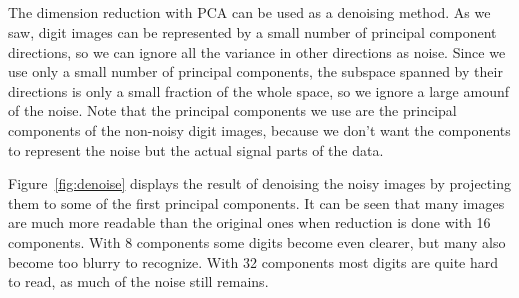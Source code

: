 \documentclass{article}
\begin{document}
\subsection{}

The dimension reduction with PCA can be used as a denoising method.
As we saw, digit images can be represented by a small number of principal component directions, so we can ignore all the variance in other directions as noise.
Since we use only a small number of principal components, the subspace spanned by their directions is only a small fraction of the whole space, so we ignore a large amounf of the noise.
Note that the principal components we use are the principal components of the non-noisy digit images, because we don't want the components to represent the noise but the actual signal parts of the data.

Figure~\ref{fig:denoise} displays the result of denoising the noisy images by projecting them to some of the first principal components. It can be seen that many images are much more readable than the original ones when reduction is done with 16 components. With 8 components some digits become even clearer, but many also become too blurry to recognize. With 32 components most digits are quite hard to read, as much of the noise still remains.
\end{document}
